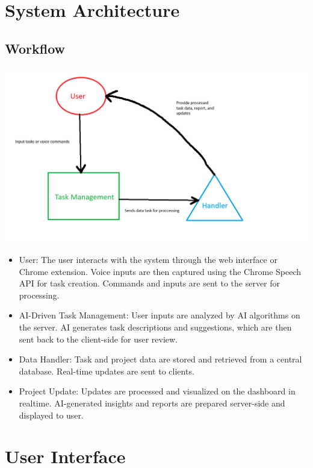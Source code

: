 \documentclass{article}
\begin{document}
\section{System Architecture}

\subsection{Workflow}

\includegraphics[width=0.9\linewidth]{./logo/workflow.png} 

\begin{itemize}
    \item User: The user interacts with the system through the web interface or Chrome extension. Voice inputs are then captured using the Chrome Speech API for task creation. Commands and inputs are sent to the server for processing.
    \item AI-Driven Task Management: User inputs are analyzed by AI algorithms on the server. AI generates task descriptions and suggestions, which are then sent back to the client-side for user review.
    \item Data Handler: Task and project data are stored and retrieved from a central database. Real-time updates are sent to clients.
    \item Project Update: Updates are processed and visualized on the dashboard in realtime. AI-generated insights and reports are prepared server-side and displayed to user.
\end{itemize}

 
\section{User Interface}
\end{document}
